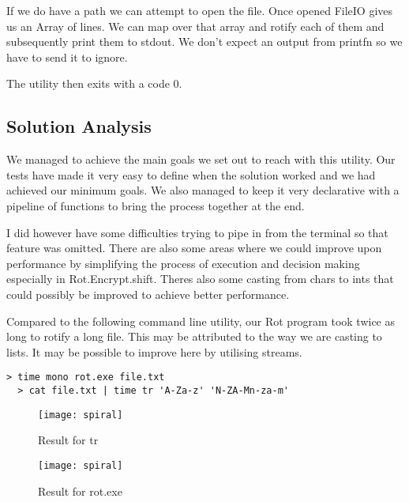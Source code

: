 If we do have a path we can attempt to open the file. Once opened FileIO gives us an
Array of lines. We can map over that array and rotify each of them and subsequently print them to stdout.
We don't expect an output from printfn so we have to send it to ignore.

The utility then exits with a code 0.

\subsection{Solution Analysis}

We managed to achieve the main goals we set out to reach with this utility.
Our tests have made it very easy to define when the solution worked and we had
achieved our minimum goals. We also managed to keep it very declarative with a pipeline of functions
to bring the process together at the end.

I did however have some difficulties trying to pipe in from the terminal so that feature was omitted.
There are also some areas where we could improve upon performance by simplifying the process of execution and decision making especially in Rot.Encrypt.shift.
Theres also some casting from chars to ints that could possibly be improved to achieve better performance.

Compared to the following command line utility, our Rot program took twice as long to rotify a long file. This may be attributed to the way we are casting to lists. It may be possible to improve here by utilising streams.
\begin{lstlisting}[caption=Method of comparison]
  > time mono rot.exe file.txt
  > cat file.txt | time tr 'A-Za-z' 'N-ZA-Mn-za-m'
\end{lstlisting}

\begin{figure}
\caption{Result for tr}
\centering
\texttt{[image: spiral]}
\end{figure}

\begin{figure}
\caption{Result for rot.exe}
\centering
\texttt{[image: spiral]}
\end{figure}

